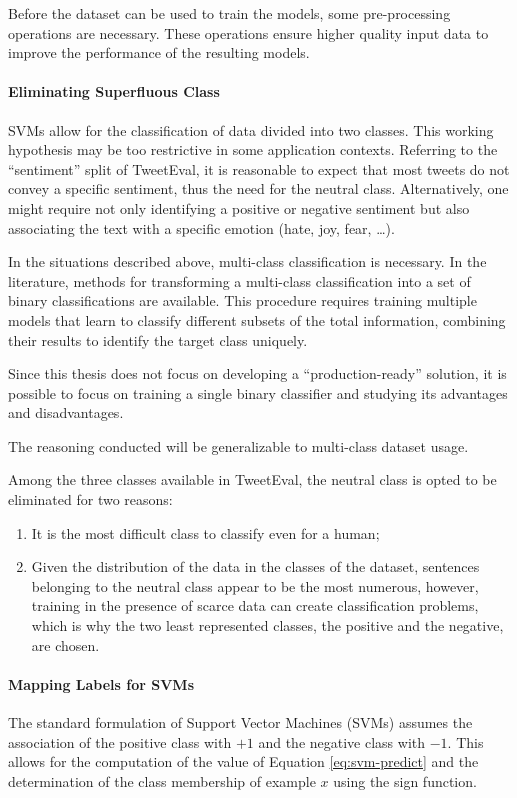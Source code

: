 Before the dataset can be used to train the models, some pre-processing operations are necessary. These operations ensure higher quality input data to improve the performance of the resulting models.

\paragraph{Eliminating Superfluous Class} SVMs allow for the classification of data divided into two classes. This working hypothesis may be too restrictive in some application contexts. Referring to the ``sentiment'' split of TweetEval, it is reasonable to expect that most tweets do not convey a specific sentiment, thus the need for the neutral class. Alternatively, one might require not only identifying a positive or negative sentiment but also associating the text with a specific emotion (hate, joy, fear, \dots).

In the situations described above, multi-class classification is necessary. In the literature, methods for transforming a multi-class classification into a set of binary classifications are available\cite{multiclass}. This procedure requires training multiple models that learn to classify different subsets of the total information, combining their results to identify the target class uniquely. 

Since this thesis does not focus on developing a ``production-ready'' solution, it is possible to focus on training a single binary classifier and studying its advantages and disadvantages. 

The reasoning conducted will be generalizable to multi-class dataset usage.

Among the three classes available in TweetEval, the neutral class is opted to be eliminated for two reasons:
\begin{enumerate}
    \item It is the most difficult class to classify even for a human;
    \item Given the distribution of the data in the classes of the dataset, sentences belonging to the neutral class appear to be the most numerous, however, training in the presence of scarce data can create classification problems, which is why the two least represented classes, the positive and the negative, are chosen.
\end{enumerate}

\paragraph{Mapping Labels for SVMs} The standard formulation of Support Vector Machines (SVMs) assumes the association of the positive class with $+1$ and the negative class with $-1$. This allows for the computation of the value of Equation \eqref{eq:svm-predict} and the determination of the class membership of example $x$ using the sign function.

